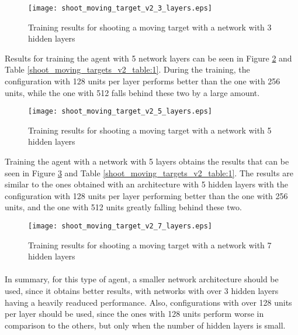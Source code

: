\begin{figure}
    \begin{center}
        \texttt{[image: shoot\_moving\_target\_v2\_3\_layers.eps]}
        \caption{Training results for shooting a moving target with a network with 3 hidden layers}
        \label{train_results_shoot_v2_3_layers}
    \end{center}
\end{figure}

Results for training the agent with 5 network layers can be seen in Figure \ref{train_results_shoot_v2_5_layers} and Table \ref{shoot_moving_targets_v2_table:1}. During the training, the configuration with 128 units per layer performs better than the one with 256 units, while the one with 512 falls behind these two by a large amount.

\begin{figure}
    \begin{center}
        \texttt{[image: shoot\_moving\_target\_v2\_5\_layers.eps]}
        \caption{Training results for shooting a moving target with a network with 5 hidden layers}
        \label{train_results_shoot_v2_5_layers}
    \end{center}
\end{figure}

Training the agent with a network with 5 layers obtains the results that can be seen in Figure \ref{train_results_shoot_v2_7_layers} and Table \ref{shoot_moving_targets_v2_table:1}. The results are similar to the ones obtained with an architecture with 5 hidden layers with the configuration with 128 units per layer performing better than the one with 256 units, and the one with 512 units greatly falling behind these two.

\begin{figure}
    \begin{center}
        \texttt{[image: shoot\_moving\_target\_v2\_7\_layers.eps]}
        \caption{Training results for shooting a moving target with a network with 7 hidden layers}
        \label{train_results_shoot_v2_7_layers}
    \end{center}
\end{figure}


\paragraph{}
In summary, for this type of agent, a smaller network architecture should be used, since it obtains better results, with networks with over 3 hidden layers having a heavily readuced performance. Also, configurations with over 128 units per layer should be used, since the ones with 128 units perform worse in comparison to the others, but only when the number of hidden layers is small.

